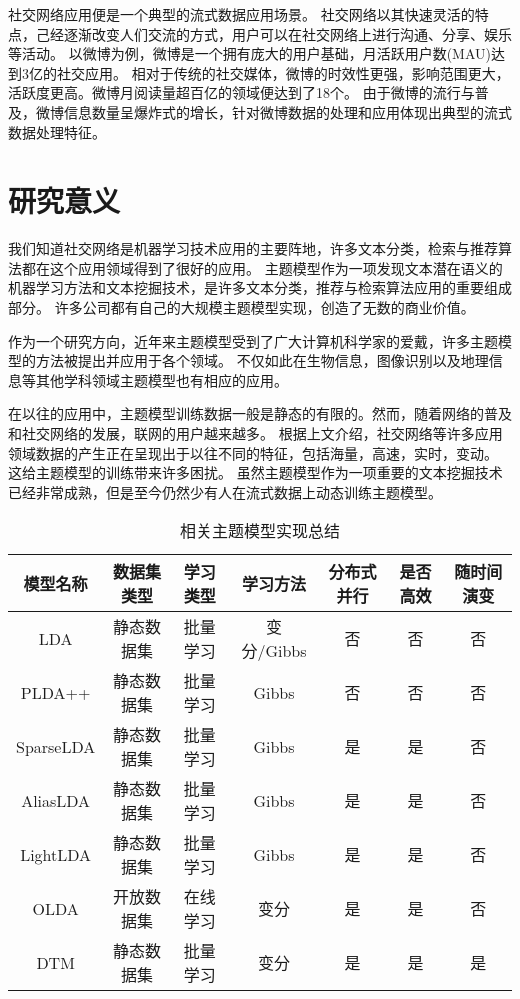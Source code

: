社交网络应用便是一个典型的流式数据应用场景。
社交网络以其快速灵活的特点，己经逐渐改变人们交流的方式，用户可以在社交网络上进行沟通、分享、娱乐等活动。
以微博为例，微博是一个拥有庞大的用户基础，月活跃用户数(MAU)达到3亿的社交应用。
相对于传统的社交媒体，微博的时效性更强，影响范围更大，活跃度更高。微博月阅读量超百亿的领域便达到了18个。
由于微博的流行与普及，微博信息数量呈爆炸式的增长，针对微博数据的处理和应用体现出典型的流式数据处理特征。

\section{研究意义}
我们知道社交网络是机器学习技术应用的主要阵地，许多文本分类，检索与推荐算法都在这个应用领域得到了很好的应用。
主题模型作为一项发现文本潜在语义的机器学习方法和文本挖掘技术，是许多文本分类，推荐与检索算法应用的重要组成部分。
许多公司都有自己的大规模主题模型实现，创造了无数的商业价值。

作为一个研究方向，近年来主题模型受到了广大计算机科学家的爱戴，许多主题模型的方法被提出并应用于各个领域。
不仅如此在生物信息，图像识别以及地理信息等其他学科领域主题模型也有相应的应用。

在以往的应用中，主题模型训练数据一般是静态的有限的。然而，随着网络的普及和社交网络的发展，联网的用户越来越多。
根据上文介绍，社交网络等许多应用领域数据的产生正在呈现出于以往不同的特征，包括海量，高速，实时，变动。
这给主题模型的训练带来许多困扰。
虽然主题模型作为一项重要的文本挖掘技术已经非常成熟，但是至今仍然少有人在流式数据上动态训练主题模型。

\begin{table}[!hbp]
\begin{tabular}{|c|c|c|c|c|c|c|}
\hline
模型名称 & 数据集类型 & 学习类型 & 学习方法 & 分布式并行 & 是否高效 & 随时间演变 \\
\hline
LDA & 静态数据集 & 批量学习 & 变分/Gibbs & 否 & 否 & 否 \\
\hline
PLDA++ & 静态数据集 &  批量学习 & Gibbs & 否 & 否 & 否 \\
\hline
SparseLDA &静态数据集&  批量学习 & Gibbs & 是 & 是 & 否 \\
\hline
AliasLDA &静态数据集&  批量学习 & Gibbs & 是 & 是 & 否 \\
\hline
LightLDA &静态数据集&  批量学习 & Gibbs & 是 & 是 & 否 \\
\hline
OLDA & 开放数据集 & 在线学习 & 变分 & 是 & 是 & 否 \\
\hline
DTM & 静态数据集& 批量学习 & 变分 & 是 & 是 & 是 \\
\hline
\end{tabular}
\label{tab:topic-model}
\caption{相关主题模型实现总结}
\end{table}

